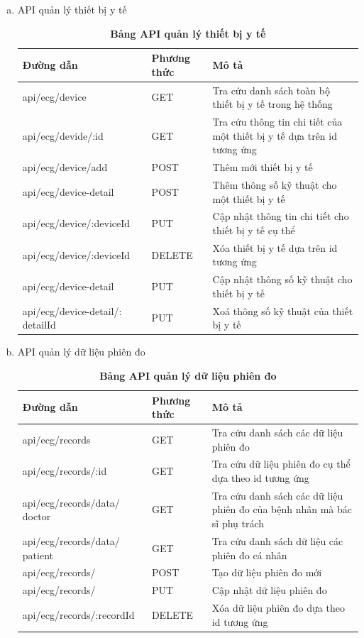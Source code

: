 \begin{enumerate}[a)]
  \item API quản lý thiết bị y tế
  \begin{xltabular}{\textwidth}{
	| >{\raggedright\arraybackslash}m{4.8cm}
	| >{\centering\arraybackslash}m{2.8cm}
	| >{\raggedright\arraybackslash}X |
	}
	\caption{\bfseries \fontsize{12pt}{0pt}\selectfont Bảng API quản lý thiết bị y tế}
	\label{table_api_device}
	\\
	\hline
	\bfseries Đường dẫn    &\bfseries Phương thức    &\bfseries Mô tả\\ \hline
	api/ecg/device   &   GET  & Tra cứu danh sách toàn bộ thiết bị y tế trong hệ thống\\ \hline
	api/ecg/devide/:id   &    GET    & Tra cứu thông tin chi tiết của một thiết bị y tế dựa trên id tương ứng \\ \hline
	api/ecg/device/add &   POST     & Thêm mới thiết bị y tế \\ \hline
	api/ecg/device-detail &   POST     & Thêm thông số kỹ thuật cho một thiết bị y tế \\ \hline
	api/ecg/device/:deviceId  &     PUT   & Cập nhật thông tin chi tiết cho thiết bị y tế cụ thể \\ \hline
	api/ecg/device/:deviceId  &     DELETE   & Xóa thiết bị y tế dựa trên id tương ứng \\ \hline
	api/ecg/device-detail  &     PUT   & Cập nhật thông số kỹ thuật cho thiết bị y tế \\ \hline
	api/ecg/device-detail/: detailId  &     PUT   & Xoá thông số kỹ thuật của thiết bị y tế \\ \hline
  \end{xltabular}
  
  \item API quản lý dữ liệu phiên đo
  \begin{xltabular}{\textwidth}{
	| >{\raggedright\arraybackslash}p{5cm}
	| >{\centering\arraybackslash}m{2.8cm}
	| >{\raggedright\arraybackslash}X |
	}
	\caption{\bfseries \fontsize{12pt}{0pt}\selectfont Bảng API quản lý dữ liệu phiên đo}
	\label{table_api_record}
	\\
	\hline
	\bfseries Đường dẫn    &\bfseries Phương thức    &\bfseries Mô tả \\ \hline
	 api/ecg/records   &   GET  & Tra cứu danh sách các dữ liệu phiên đo \\ \hline
	 api/ecg/records/:id   &    GET    & Tra cứu dữ liệu phiên đo cụ thể dựa theo id tương ứng \\ \hline
	 api/ecg/records/data/ doctor &   GET     & Tra cứu danh sách các dữ liệu phiên đo của bệnh nhân mà bác sĩ phụ trách \\ \hline
	 api/ecg/records/data/ patient &   GET     & Tra cứu danh sách dữ liệu các phiên đo cá nhân \\ \hline
	 api/ecg/records/   &    POST    & Tạo dữ liệu phiên đo mới \\ \hline
	 api/ecg/records/   &    PUT    & Cập nhật dữ liệu phiên đo \\ \hline
	 api/ecg/records/:recordId  &    DELETE    & Xóa dữ liệu phiên đo dựa theo id tương ứng \\ \hline
	\end{xltabular}
  

\end{enumerate}
